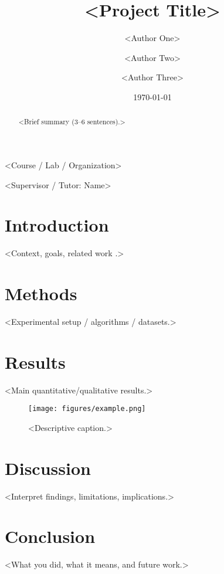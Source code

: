 \documentclass[a4paper,12pt]{article}
\title{<Project Title>}
\author{
  <Author One> \and <Author Two> \and <Author Three>
}
\date{\today}
\begin{document}
\begin{titlepage}
  \centering
  {\huge\bfseries \thetitle\par}
  \vspace{1.5cm}
  {\Large <Course / Lab / Organization>\par}
  \vspace{1cm}
  {\large \theauthor\par}
  \vspace{0.5cm}
  {\par}
  \vfill
  {\large <Supervisor / Tutor: Name>\par}
  \vspace{0.5cm}
  {\large \thedate\par}
\end{titlepage}

\tableofcontents
\newpage

\begin{abstract}
<Brief summary (3–6 sentences).>
\end{abstract}

\section{Introduction}
<Context, goals, related work \cite{key-example}.>

\section{Methods}
<Experimental setup / algorithms / datasets.>

\section{Results}
<Main quantitative/qualitative results.>
\begin{figure}[htbp]
  \centering
  \texttt{[image: figures/example.png]}
  \caption{<Descriptive caption.>}
  \label{fig:example}
\end{figure}

\section{Discussion}
<Interpret findings, limitations, implications.>

\section{Conclusion}
<What you did, what it means, and future work.>

\printbibliography
\end{document}

